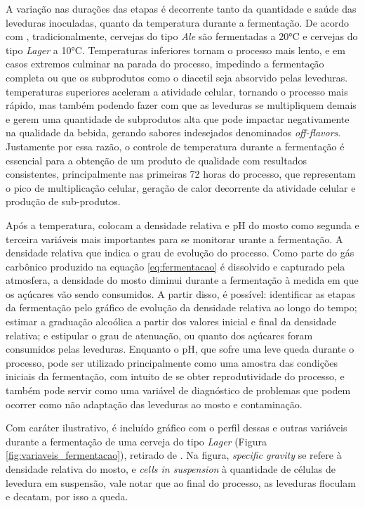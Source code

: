A variação nas durações das etapas é decorrente tanto da quantidade e saúde das leveduras inoculadas, quanto da temperatura 
durante a fermentação. De acordo com , tradicionalmente, cervejas do tipo \textit{Ale} são fermentadas a 20°C e cervejas do tipo 
\textit{Lager} a 10°C. Temperaturas inferiores tornam o processo mais lento, e em casos extremos culminar na parada do processo, impedindo a fermentação completa ou que os subprodutos como o diacetil seja absorvido pelas leveduras. temperaturas superiores aceleram a atividade celular, tornando o processo mais rápido, mas também podendo fazer com que as leveduras se multipliquem demais e gerem uma quantidade de subprodutos alta que pode impactar negativamente na qualidade da bebida, gerando sabores indesejados denominados \textit{off-flavors}. 
Justamente por essa razão, o controle de temperatura durante a fermentação é essencial para a obtenção de um produto de 
qualidade com resultados consistentes, principalmente nas primeiras 72 horas do processo, que representam o pico de multiplicação celular, geração de calor decorrente da atividade celular e produção de sub-produtos.

Após a temperatura,  colocam a densidade relativa e pH do mosto como segunda e terceira
variáveis mais importantes para se monitorar urante a fermentação.
A densidade relativa que indica o grau de evolução do processo. Como parte do gás carbônico produzido 
na equação \ref{eq:fermentacao} é dissolvido e capturado pela atmosfera, a densidade do mosto diminui durante a 
fermentação à medida em que os açúcares vão sendo consumidos. A partir disso, é possível: identificar as etapas da 
fermentação pelo gráfico de evolução da densidade relativa ao longo do tempo; estimar a graduação alcoólica a partir dos 
valores inicial e final da densidade relativa; e estipular o grau de atenuação, ou quanto dos açúcares foram consumidos 
pelas leveduras.
Enquanto o pH, que sofre uma leve queda durante o processo, pode ser 
utilizado principalmente como uma amostra das condições iniciais da fermentação, com intuito de se obter reprodutividade do 
processo, e também pode servir como uma variável de diagnóstico de problemas que podem ocorrer como não adaptação das 
leveduras ao mosto e contaminação.

Com caráter ilustrativo, é incluído gráfico com o perfil dessas e outras variáveis durante a fermentação de uma cerveja 
do tipo \textit{Lager} (Figura \ref{fig:variaveis_fermentacao}), retirado de . Na figura, \textit{specific gravity} se refere à
densidade relativa do mosto, e \textit{cells in suspension} à quantidade de células de levedura em suspensão, vale notar que 
ao final do processo, as leveduras floculam e decatam, por isso a queda.

